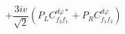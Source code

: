 %
\begin{dmath*}
%
  +  \frac{3 i v}{\sqrt{2}} \left(P_L C^{d \varphi  *}_{f_2 f_1} + P_R C^{d \varphi  }_{f_1 f_2}\right)
%
\end{dmath*}
%

